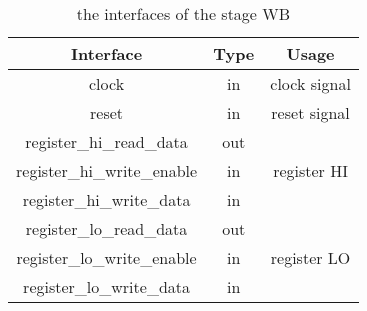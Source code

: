 \begin{table}[!h]
\centering
\begin{tabular}{ccc}
\toprule
Interface & Type & Usage \\ \midrule
clock & in & clock signal \\ \hline
reset & in & reset signal \\ \hline
register\_hi\_read\_data & out & \multirow{3}{*}{register HI} \\ \cline{1-2}
register\_hi\_write\_enable & in &  \\ \cline{1-2}
register\_hi\_write\_data & in &  \\ \hline
register\_lo\_read\_data & out & \multirow{3}{*}{register LO} \\ \cline{1-2}
register\_lo\_write\_enable & in &  \\ \cline{1-2}
register\_lo\_write\_data & in &  \\ \bottomrule
\end{tabular}
\caption{the interfaces of the stage WB}
\end{table}